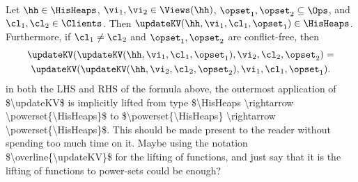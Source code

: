 \begin{proposition}
\label{prop:updatekv_commutative}
Let $\hh \in \HisHeaps$, $\vi_1, \vi_2 \in \Views(\hh)$, $\opset_1, \opset_2 \subseteq \Ops$, and $\cl_1, \cl_2 \in \Clients$. 
Then $\updateKV(\hh, \vi_1, \cl_1, \opset_1) \in \HisHeaps$. Furthermore, if $\cl_1 \neq \cl_2$ and $\opset_1, \opset_2$ 
are conflict-free, then 
\begin{multline*}
\updateKV(\updateKV(\hh, \vi_1, \cl_1, \opset_1), \vi_2, \cl_2, \opset_2)  =\\ 
\updateKV(\updateKV(\hh, \vi_2, \cl_2, \opset_2), \vi_1, \cl_1, \opset_1).
\end{multline*}
\ac{in both the LHS and RHS of the formula above, the outermost application of $\updateKV$ is implicitly lifted from type 
$\HisHeaps \rightarrow \powerset{\HisHeaps}$ to $\powerset{\HisHeaps} \rightarrow \powerset{\HisHeaps}$. This should 
be made present to the reader without spending too much time on it. Maybe using the notation $\overline{\updateKV}$ for 
the lifting of functions, and just say that it is the lifting of functions to power-sets could be enough?}
\end{proposition}
